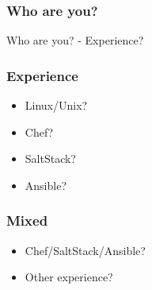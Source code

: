 \frame
{
  \frametitle{Who are you?}

  \begin{center}
    \Huge Who are you? - Experience?
  \end{center}
}


\frame
{
  \frametitle{Experience}

  \begin{itemize}
  \item<1-> Linux/Unix?
  \item<2-> Chef?
  \item<3-> SaltStack?
  \item<4-> Ansible?
  \end{itemize}
}

\frame
{
  \frametitle{Mixed}
  \begin{itemize}
  \item<1-> Chef/SaltStack/Ansible?
  \item<2-> Other experience?
  \end{itemize}
}
